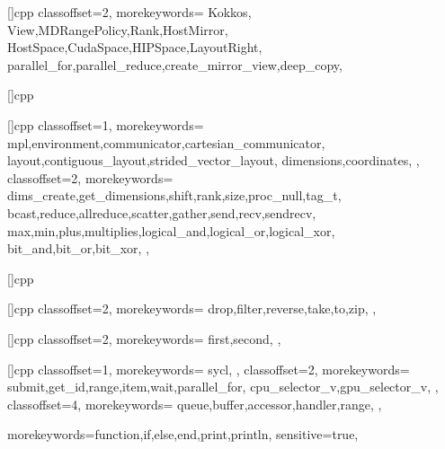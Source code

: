 []{cpp}{
  classoffset=2,
  morekeywords={
    Kokkos,
    View,MDRangePolicy,Rank,HostMirror,
    HostSpace,CudaSpace,HIPSpace,LayoutRight,
    parallel_for,parallel_reduce,create_mirror_view,deep_copy,
  }
}

[]{cpp}{
}

[]{cpp}{
  classoffset=1,
  morekeywords={
    mpl,environment,communicator,cartesian_communicator,
    layout,contiguous_layout,strided_vector_layout,
    dimensions,coordinates,
  },
  classoffset=2,
  morekeywords={
    dims_create,get_dimensions,shift,rank,size,proc_null,tag_t,
    bcast,reduce,allreduce,scatter,gather,send,recv,sendrecv,  
    max,min,plus,multiplies,logical_and,logical_or,logical_xor,
    bit_and,bit_or,bit_xor,
  },
}

[]{cpp}{
}

[]{cpp}{
  classoffset=2,
  morekeywords={
    drop,filter,reverse,take,to,zip,
  },
}

[]{cpp}{
  classoffset=2,
  morekeywords={
    first,second,
  },
}

[]{cpp}{
  classoffset=1,
  morekeywords={
    sycl,
  },
  classoffset=2,
  morekeywords={
    submit,get_id,range,item,wait,parallel_for,
    cpu_selector_v,gpu_selector_v,
  },
  classoffset=4,
  morekeywords={
    queue,buffer,accessor,handler,range,
  },
}

                  {morekeywords={function,if,else,end,print,println},
                    sensitive=true,
                  }
                  
